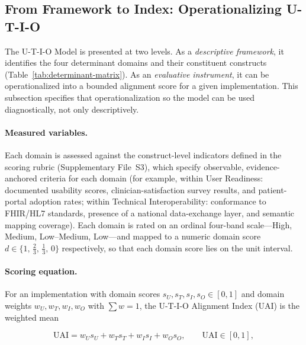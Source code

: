 
\subsection{From Framework to Index: Operationalizing U-T-I-O}

The U-T-I-O Model is presented at two levels. As a \textit{descriptive framework},
it identifies the four determinant domains and their constituent constructs
(Table~\ref{tab:determinant-matrix}). As an \textit{evaluative instrument}, it can
be operationalized into a bounded alignment score for a given implementation. This
subsection specifies that operationalization so the model can be used
diagnostically, not only descriptively.

\paragraph{Measured variables.} Each domain is assessed against the construct-level
indicators defined in the scoring rubric (Supplementary File~S3), which specify
observable, evidence-anchored criteria for each domain (for example, within User
Readiness: documented usability scores, clinician-satisfaction survey results, and
patient-portal adoption rates; within Technical Interoperability: conformance to
FHIR/HL7 standards, presence of a national data-exchange layer, and semantic
mapping coverage). Each domain is rated on an ordinal four-band scale---High,
Medium, Low--Medium, Low---and mapped to a numeric domain score $d \in \{1,\,
\tfrac{2}{3},\, \tfrac{1}{3},\, 0\}$ respectively, so that each domain score lies
on the unit interval.

\paragraph{Scoring equation.} For an implementation with domain scores
$s_U, s_T, s_I, s_O \in [0,1]$ and domain weights $w_U, w_T, w_I, w_O$ with
$\sum w = 1$, the U-T-I-O Alignment Index (UAI) is the weighted mean

\begin{equation}
\mathrm{UAI} = w_U s_U + w_T s_T + w_I s_I + w_O s_O, \qquad \mathrm{UAI} \in [0,1],
\label{eq:uai}
\end{equation}

